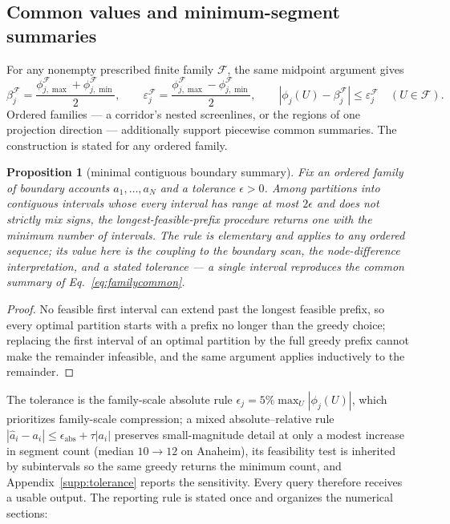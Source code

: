 \documentclass[a4paper,fleqn]{cas-sc}
\newtheorem{proposition}[theorem]{Proposition}
\begin{document}
\subsection{Common values and minimum-segment summaries}\label{sec:segments}
For any nonempty prescribed finite family $\mathcal F$, the same midpoint argument gives
\begin{equation}
\beta_j^{\mathcal F}=\frac{\phi_{j,\max}^{\mathcal F}+\phi_{j,\min}^{\mathcal F}}2,
\qquad \varepsilon_j^{\mathcal F}=\frac{\phi_{j,\max}^{\mathcal F}-\phi_{j,\min}^{\mathcal F}}2,
\qquad |\phi_j(U)-\beta_j^{\mathcal F}|\le\varepsilon_j^{\mathcal F}\quad(U\in\mathcal F).
\label{eq:familycommon}
\end{equation}
Ordered families --- a corridor's nested screenlines, or the regions of
one projection direction --- additionally support piecewise common
summaries. The construction is stated for any ordered family.
\begin{proposition}[minimal contiguous boundary summary]\label{prop:segmented}
Fix an ordered family of boundary accounts $a_1,\ldots,a_N$ and a
tolerance $\epsilon>0$. Among partitions into contiguous intervals
whose every interval has range at most $2\epsilon$ and does not
strictly mix signs, the longest-feasible-prefix procedure returns one
with the minimum number of intervals. The rule is elementary and
applies to any ordered sequence; its value here is the coupling to the
boundary scan, the node-difference interpretation, and a stated
tolerance --- a single interval reproduces the common summary of
Eq.~\eqref{eq:familycommon}.
\end{proposition}
\begin{proof}
No feasible first interval can extend past the longest feasible prefix,
so every optimal partition starts with a prefix no longer than the
greedy choice; replacing the first interval of an optimal partition by
the full greedy prefix cannot make the remainder infeasible, and the
same argument applies inductively to the remainder.
\end{proof}
The tolerance is the family-scale absolute rule
$\epsilon_j=5\%\max_U|\phi_j(U)|$, which prioritizes family-scale
compression; a mixed absolute--relative rule
$|\hat a_i-a_i|\le\epsilon_{\mathrm{abs}}+\tau|a_i|$ preserves
small-magnitude detail at only a modest increase in segment count
(median $10\to12$ on Anaheim), its feasibility test is inherited
by subintervals so the same greedy returns the minimum count, and
Appendix~\ref{supp:tolerance} reports the sensitivity.
Every query therefore receives a usable output. The reporting rule is
stated once and organizes the numerical sections:
\end{document}
